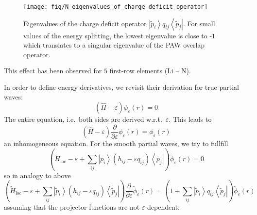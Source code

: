 \documentclass[oribibl]{llncs}
\newcommand{\um}[1]{_{\mathrm{#1}}}
\newcommand{\ket}[1]{\left| #1 \right\rangle}
\newcommand{\bra}[1]{\left\langle #1 \right|}
\begin{document}
\begin{figure} [ht]
  \centering
  \begin{minipage}[c]{.990\textwidth}
	\texttt{[image: fig/N\_eigenvalues\_of\_charge-deficit\_operator]} %
  \end{minipage}\hfill
  \begin{minipage}[c]{.009\textwidth}
  \end{minipage}
  \caption{Eigenvalues of the charge deficit operator $\ket{\tilde{p}_i} q_{ij} \bra{\tilde{p}_j}$.
  For small values of the energy splitting, the lowest eigenvalue is close to -$1$ which translates
  to a singular eigenvalue of the \ac{PAW} overlap operator.
  } \label{fig:eigenvalues_of_charge-deficit_operator}
\end{figure}

This effect has been observed for $5$ first-row elements (Li -- N).

\newpage

In order to define energy derivatives, we revisit their derivation for true partial waves:
\begin{equation}
  \left( \hat H - \varepsilon \right) \phi_\varepsilon(r) = 0
\end{equation}
The entire equation, i.e.~both sides are derived w.r.t.~$\varepsilon$. This leads to
\begin{equation}
  \left( \hat H - \varepsilon \right) \frac{\partial}{\partial \varepsilon} \phi_\varepsilon(r) = \phi_\varepsilon(r)
\end{equation}
an inhomogeneous equation.
For the smooth partial waves, we try to fullfill
\begin{equation}
  \left( \tilde H\um{loc} - \varepsilon + \sum_{ij} \ket{\tilde p_i} (h_{ij} - \varepsilon q_{ij} ) \bra{\tilde p_j} \right) \tilde{\phi}_\varepsilon(r) = 0
\end{equation}
so in analogy to above
\begin{equation}
  \left( \tilde H\um{loc} - \varepsilon + \sum_{ij} \ket{\tilde p_i} (h_{ij} - \varepsilon q_{ij} ) \bra{\tilde p_j} \right) 
  \frac{\partial}{\partial \varepsilon} \tilde{\phi}_\varepsilon(r) = \left( 1 + \sum_{ij} \ket{\tilde p_i} q_{ij} \bra{\tilde p_j} \right) \tilde{\phi}_\varepsilon(r)
\end{equation}
assuming that the projector functions are not $\varepsilon$-dependent.

\newpage



 
\end{document}
